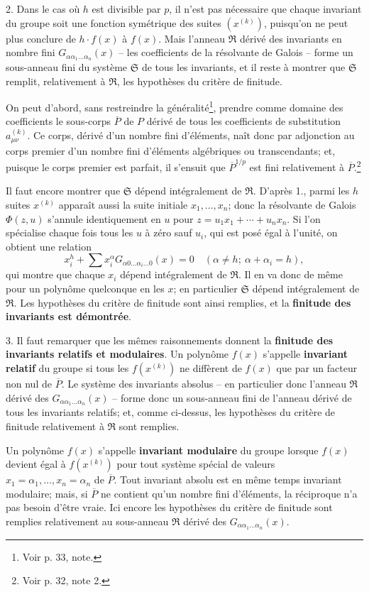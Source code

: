 2. Dans le cas où $h$ est divisible par $p$, il n'est pas nécessaire que chaque invariant du groupe soit une fonction symétrique des suites $(x^{(k)})$, puisqu'on ne peut plus conclure de $h\cdot f(x)$ à $f(x)$. Mais l'anneau $\mathfrak R$ dérivé des invariants en nombre fini $G_{\alpha\alpha_1\ldots\alpha_n}(x)$ -- les coefficients de la résolvante de Galois -- forme un sous-anneau fini du système $\mathfrak S$ de tous les invariants, et il reste à montrer que $\mathfrak S$ remplit, relativement à $\mathfrak R$, les hypothèses du critère de finitude.

On peut d'abord, sans restreindre la généralité\footnote{Voir p. 33, note.}, prendre comme domaine des coefficients le sous-corps $\overline P$ de $P$ dérivé de tous les coefficients de substitution $a_{\mu\nu}^{(k)}$. Ce corps, dérivé d'un nombre fini d'éléments, naît donc par adjonction au corps premier d'un nombre fini d'éléments algébriques ou transcendants; et, puisque le corps premier est parfait, il s'ensuit que $\overline P^{1/p}$ est fini relativement à $\overline P$.\footnote{Voir p. 32, note 2.}

Il faut encore montrer que $\mathfrak S$ dépend intégralement de $\mathfrak R$. D'après 1., parmi les $h$ suites $x^{(k)}$ apparaît aussi la suite initiale $x_1,\ldots,x_n$; donc la résolvante de Galois $\Phi(z,u)$ s'annule identiquement en $u$ pour $z=u_1x_1+\cdots+u_nx_n$. Si l'on spécialise chaque fois tous les $u$ à zéro sauf $u_i$, qui est posé égal à l'unité, on obtient une relation
\[
 x_i^h+\sum x_i^\alpha G_{\alpha0\ldots\alpha_i\ldots0}(x)=0
 \quad (\alpha\ne h;\ \alpha+\alpha_i=h),
\]
qui montre que chaque $x_i$ dépend intégralement de $\mathfrak R$. Il en va donc de même pour un polynôme quelconque en les $x$; en particulier $\mathfrak S$ dépend intégralement de $\mathfrak R$. Les hypothèses du critère de finitude sont ainsi remplies, et la \textbf{finitude des invariants est démontrée}.

3. Il faut remarquer que les mêmes raisonnements donnent la \textbf{finitude des invariants relatifs et modulaires}. Un polynôme $f(x)$ s'appelle \textbf{invariant relatif} du groupe si tous les $f(x^{(k)})$ ne diffèrent de $f(x)$ que par un facteur non nul de $\overline P$. Le système des invariants absolus -- en particulier donc l'anneau $\mathfrak R$ dérivé des $G_{\alpha\alpha_1\ldots\alpha_n}(x)$ -- forme donc un sous-anneau fini de l'anneau dérivé de tous les invariants relatifs; et, comme ci-dessus, les hypothèses du critère de finitude relativement à $\mathfrak R$ sont remplies.

Un polynôme $f(x)$ s'appelle \textbf{invariant modulaire} du groupe lorsque $f(x)$ devient égal à $f(x^{(k)})$ pour tout système spécial de valeurs $x_1=\alpha_1,\ldots,x_n=\alpha_n$ de $\overline P$. Tout invariant absolu est en même temps invariant modulaire; mais, si $\overline P$ ne contient qu'un nombre fini d'éléments, la réciproque n'a pas besoin d'être vraie. Ici encore les hypothèses du critère de finitude sont remplies relativement au sous-anneau $\mathfrak R$ dérivé des $G_{\alpha\alpha_1\ldots\alpha_n}(x)$.

